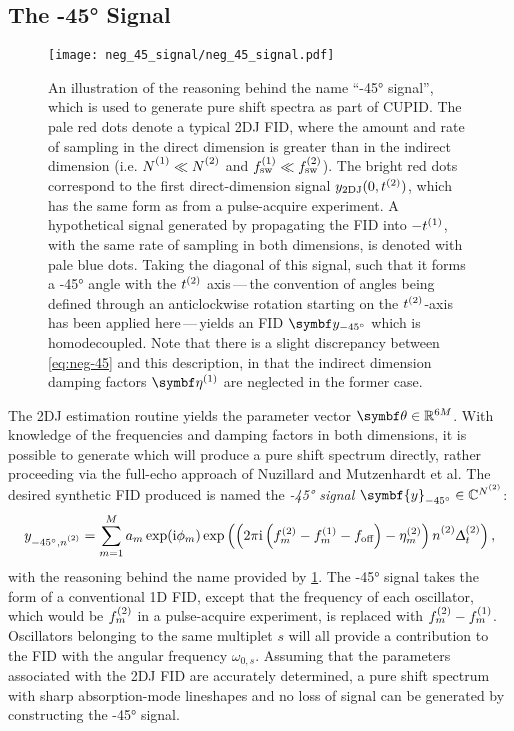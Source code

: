 \subsection{The \ang{-45} Signal}
\begin{figure}
    \centering
    \texttt{[image: neg\_45\_signal/neg\_45\_signal.pdf]}
    \caption[
        An illustration of the reasoning behind the name ``\ang{-45}
        signal'', which is used to generate pure shift spectra as part of
        \acs{CUPID}.
    ]{
        An illustration of the reasoning behind the name ``\ang{-45}
        signal'', which is used to generate pure shift spectra as part of
        \ac{CUPID}. The pale red
        dots denote
        a typical \ac{2DJ} \ac{FID}, where
        the amount and rate of sampling in the direct dimension is greater than
        in the indirect dimension (i.e. $\None \ll \Ntwo$ and $f_{\mathrm{sw}}^{(1)} \ll
        f_{\mathrm{sw}}^{(2)}$). The bright red dots correspond to the first direct-dimension
        signal $y_{\text{2DJ}}(0,t^{(2)})$, which has the same form as
         from a pulse-acquire experiment. A hypothetical signal
        generated by propagating the \ac{FID} into $-t^{(1)}$, with the same rate
        of sampling in both dimensions, is denoted with pale blue dots. Taking
        the diagonal of this signal, such that it forms a \ang{-45} angle with the
        $t^{(2)}$ axis\,---\,the convention of angles being defined through an
        anticlockwise rotation starting on the $t^{(2)}$-axis has been applied
        here\,---\,yields an \ac{FID}
        $\by_{\ang{-45}}$  which is
        homodecoupled. Note that there is a slight discrepancy
        between \cref{eq:neg-45} and this description, in that the
        indirect dimension damping factors $\bdetaone$ are neglected in the
        former case.
    }
    \label{fig:neg-45}
\end{figure}
The \ac{2DJ} estimation routine yields the parameter vector $\bth \in
\mathbb{R}^{6M}$. With
knowledge of the frequencies and damping factors in both dimensions, it is
possible to generate  which will produce a pure shift spectrum
directly, rather proceeding via the full-echo approach of Nuzillard and
Mutzenhardt et al.
The desired synthetic \ac{FID} produced is named the \emph{\ang{-45} signal}
$\symbf{y}_{\ang{-45}} \in \mathbb{C}^{\Ntwo}$:
\begin{equation}
    y_{\ang{-45},\ntwo} =
        \sum_{m=1}^{M} a_m \exp (\iu \phi_m)
        \exp\left(\left(2 \pi \iu \left(\ftwo_m - \fone_m - \foff\right)
                - \etatwo_m
            \right) \ntwo \Dttwo
        \right),
    \label{eq:neg-45}
\end{equation}
with the reasoning behind the name provided by \cref{fig:neg-45}.
The \ang{-45} signal
takes the form of a conventional \ac{1D} \ac{FID},
except that the frequency of each oscillator, which would be $f^{(2)}_m$ in a
pulse-acquire experiment,
is replaced with $f^{(2)}_m - f^{(1)}_m$. Oscillators belonging to the same
multiplet $s$ will all provide a contribution to the \ac{FID} with the
angular frequency $\omega_{0,s}$.
Assuming that the parameters associated with the \ac{2DJ}
\ac{FID} are accurately determined, a pure shift spectrum with sharp
absorption-mode lineshapes and no loss of signal can be generated by
constructing the \ang{-45} signal.


